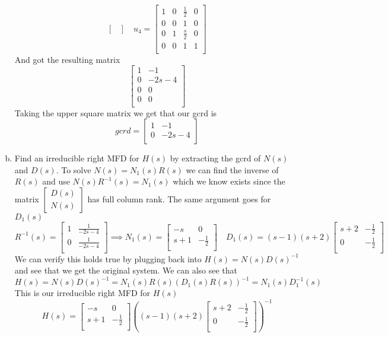 \documentclass{article}
\begin{document}
\begin{enumerate}[(a)]
$$\begin{bmatrix}
\end{bmatrix}
\quad
u_4 =
\begin{bmatrix}
1 & 0 & \frac{1}{2} & 0 \\
0 & 0 & 1 & 0 \\
0 & 1 & \frac{s}{2} & 0 \\
0 & 0 & 1 & 1 \\
\end{bmatrix}
$$
And got the resulting matrix
$$
\begin{bmatrix}
1 & -1 \\
0 & -2 s-4 \\
0 & 0 \\
0 & 0 \\
\end{bmatrix}
$$
Taking the upper square matrix we get that our gcrd is
$$
gcrd =
\begin{bmatrix}
1 & -1 \\
0 & -2s-4 \\
\end{bmatrix}
$$

\item Find an irreducible right MFD for $H(s)$ by extracting the gcrd of $N(s)$ and $D(s)$.
\newline
To solve $N(s) = N_1(s)R(s)$ we can find the inverse of $R(s)$ and use $N(s)R^{-1}(s) = N_1(s)$
which we know exists since the matrix $\begin{bmatrix} D(s) \\ N(s) \end{bmatrix}$ has full column rank.
The same argument goes for $D_1(s)$
$$
R^{-1}(s) =
\begin{bmatrix}
1 & \frac{1}{-2s-4} \\
0 & \frac{1}{-2s-4} \\
\end{bmatrix}
\implies
N_1(s) =
\begin{bmatrix}
-s & 0 \\
s+1 & -\frac{1}{2} \\
\end{bmatrix}
\quad
D_1(s) =
(s-1)(s+2)
\begin{bmatrix}
s+2 & -\frac{1}{2} \\
0 & -\frac{1}{2} \\
\end{bmatrix}
$$
We can verify this holds true by plugging back into $H(s) = N(s)D(s)^{-1}$ and see that we get the original system.
We can also see that
$$ H(s) = N(s)D(s)^{-1} = N_1(s)R(s)\left(D_1(s)R(s)\right)^{-1} = N_1(s)D_1^{-1}(s) $$
This is our irreducible right MFD for $H(s)$
$$
H(s) =
\begin{bmatrix}
-s & 0 \\
s+1 & -\frac{1}{2} \\
\end{bmatrix}
\left(
(s-1)(s+2)
\begin{bmatrix}
s+2 & -\frac{1}{2} \\
0 & -\frac{1}{2} \\
\end{bmatrix}
\right)^{-1}
$$


\end{enumerate}
\end{document}
